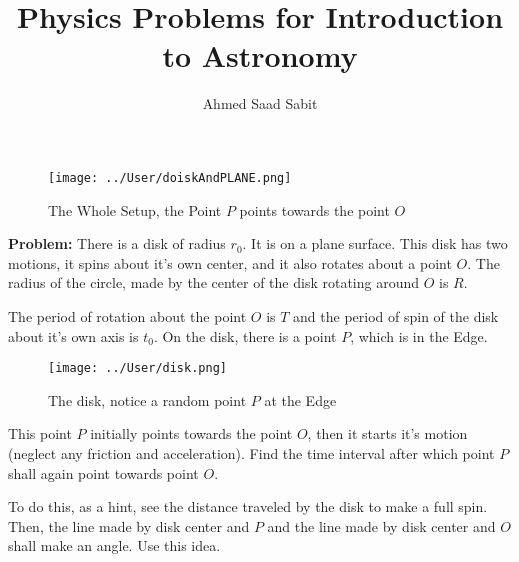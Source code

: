 \documentclass[11pt,a4paper]{article}
\author{Ahmed Saad Sabit}
\title{Physics Problems for Introduction to Astronomy}
\begin{document}
\maketitle
\begin{figure}[hbtp]
\centering
\texttt{[image: ../User/doiskAndPLANE.png]}
\caption{The Whole Setup, the Point $P$ points towards the point $O$}
\end{figure}
\textbf{Problem:} There is a disk of radius $r_0$. It is on a plane surface. This disk has two motions, it spins about it's own center, and it also rotates about a point $O$. The radius of the circle, made by the center of the disk rotating around $O$ is $R$.

The period of rotation about the point $O$ is $T$ and the period of spin of the disk about it's own axis is $t_0$. On the disk, there is a point $P$, which is in the Edge. 
\begin{figure}[hbtp]
\centering
\texttt{[image: ../User/disk.png]}
\caption{The disk, notice a random point $P$ at the Edge}
\end{figure}
This point $P$ initially points towards the point $O$, then it starts it's motion (neglect any friction and acceleration). \textsf{Find the time interval after which point $P$ shall again point towards point $O$.}

To do this, as a hint, see the distance traveled by the disk to make a full spin. Then, the line made by disk center and $P$ and the line made by disk center and $O$ shall make an angle. Use this idea.
\end{document}
